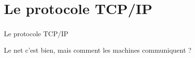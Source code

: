 

\section{Le protocole TCP/IP}
\begin{frame}\frametitle{}
    {\Huge Le protocole TCP/IP}

    \vspace{2em}

    Le net c'est bien, mais comment les machines communiquent ?
\end{frame}
